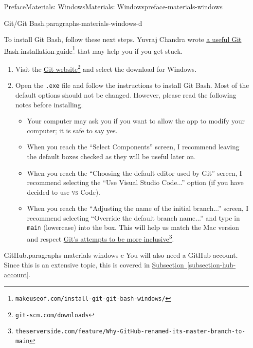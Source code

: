 \documentclass[oneside,10pt,]{book}
\newcommand{\xreffont}{\relax}
\newcommand{\mono}[1]{\texttt{#1}}
\newcommand{\initialism}[1]{\textsc{\MakeLowercase{#1}}}
\begin{document}
\begin{preface}{Preface}{Materials: Windows}{}{Materials: Windows}{}{}{preface-materials-windows}
\begin{paragraphs}{Git\slash{}Git Bash.}{paragraphs-materials-windows-d}
\par
To install Git Bash, follow these next steps. Yuvraj Chandra wrote \href{https://www.makeuseof.com/install-git-git-bash-windows/}{a useful Git Bash installation guide}\footnote{\nolinkurl{makeuseof.com/install-git-git-bash-windows/}\label{fn-materials-windows-d-d-b}} that may help you if you get stuck.%
\begin{enumerate}
\item{}Visit the \href{https://git-scm.com/downloads}{Git website}\footnote{\nolinkurl{git-scm.com/downloads}\label{fn-materials-windows-d-d-c-a-a-b}} and select the download for Windows.%
\item{}Open the \mono{.exe} file and follow the instructions to install Git Bash. Most of the default options should not be changed. However, please read the following notes before installing.%
\begin{itemize}[label=\textbullet]
\item{}Your computer may ask you if you want to allow the app to modify your computer; it is safe to say yes.%
\item{}When you reach the ``Select Components'' screen, I recommend leaving the default boxes checked as they will be useful later on.%
\item{}When you reach the ``Choosing the default editor used by Git'' screen, I recommend selecting the ``Use Visual Studio Code...'' option (if you have decided to use \initialism{VS} Code).%
\item{}When you reach the ``Adjusting the name of the initial branch...'' screen, I recommend selecting ``Override the default branch name...'' and type in \mono{main} (lowercase) into the box. This will help us match the Mac version and respect \href{https://www.theserverside.com/feature/Why-GitHub-renamed-its-master-branch-to-main}{Git's attempts to be more inclusive}\footnote{\nolinkurl{theserverside.com/feature/Why-GitHub-renamed-its-master-branch-to-main}\label{fn-materials-windows-d-d-c-b-a-b-d-a-e}}.%
\end{itemize}
%
\end{enumerate}
%
\end{paragraphs}%
\begin{paragraphs}{GitHub.}{paragraphs-materials-windows-e}%
You will also need a GitHub account. Since this is an extensive topic, this is covered in \hyperref[subsection-hub-account]{Subsection~{\xreffont\ref{subsection-hub-account}}}.%
\end{paragraphs}%
\end{preface}
\end{document}
